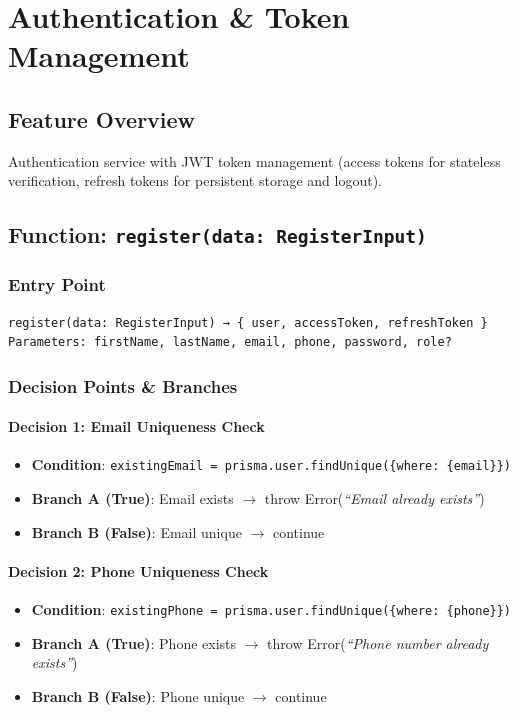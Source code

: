 \chapter{Authentication \& Token Management}

\section{Feature Overview}
Authentication service with JWT token management (access tokens for stateless verification, refresh tokens for persistent storage and logout).

\section{Function: \texttt{register(data: RegisterInput)}}

\subsection{Entry Point}
\begin{verbatim}
register(data: RegisterInput) → { user, accessToken, refreshToken }
Parameters: firstName, lastName, email, phone, password, role?
\end{verbatim}

\subsection{Decision Points \& Branches}

\subsubsection{Decision 1: Email Uniqueness Check}
\begin{itemize}
    \item \textbf{Condition}: \texttt{existingEmail = prisma.user.findUnique(\{where: \{email\}\})}
    \item \textbf{Branch A (True)}: Email exists $\rightarrow$ throw Error(\textit{``Email already exists''})
    \item \textbf{Branch B (False)}: Email unique $\rightarrow$ continue
\end{itemize}

\subsubsection{Decision 2: Phone Uniqueness Check}
\begin{itemize}
    \item \textbf{Condition}: \texttt{existingPhone = prisma.user.findUnique(\{where: \{phone\}\})}
    \item \textbf{Branch A (True)}: Phone exists $\rightarrow$ throw Error(\textit{``Phone number already exists''})
    \item \textbf{Branch B (False)}: Phone unique $\rightarrow$ continue
\end{itemize}

